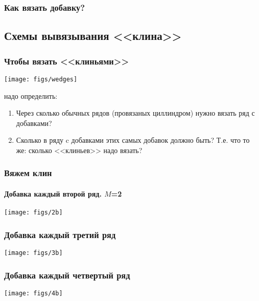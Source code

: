 \begin{frame}
    \frametitle{Как вязать добавку?}

\end{frame}


\subsection{Схемы вывязывания <<клина>>}

\begin{frame}
    \frametitle{Чтобы вязать <<клиньями>>}

    \begin{center}
        \texttt{[image: figs/wedges]}
    \end{center}

	надо определить:
    \begin{enumerate}
        \item Через сколько обычных рядов (провязаных циллиндром) нужно вязать ряд с добавками?
		\item Сколько в ряду c добавками этих самых добавок должно быть? Т.е. что то же: сколько <<клиньев>> надо вязать? 
    \end{enumerate}
\end{frame}

\begin{frame}
    \frametitle{Вяжем клин}
    \framesubtitle{Добавка каждый второй ряд. $M$=2}

    \begin{center}
        \texttt{[image: figs/2b]}
    \end{center}
\end{frame}

\begin{frame}
    \frametitle{Добавка каждый \alert{третий} ряд}

    \begin{center}
        \texttt{[image: figs/3b]}
    \end{center}
\end{frame}

\begin{frame}
    \frametitle{Добавка каждый \alert{четвертый} ряд}

    \begin{center}
        \texttt{[image: figs/4b]}
    \end{center}
\end{frame}

